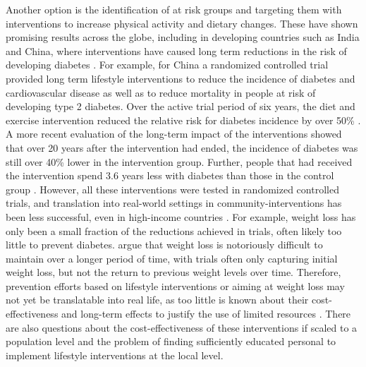 Another option is the identification of at risk groups and targeting them with interventions to increase physical activity and dietary changes. These have shown promising results across the globe, including in developing countries such as India and China, where interventions have caused long term reductions in the risk of developing diabetes \parencite{Cefalu2016}. For example, for China a randomized controlled trial provided long term lifestyle interventions to reduce the incidence of diabetes and cardiovascular disease as well as to reduce mortality in people at risk of developing type 2 diabetes. Over the active trial period of six years, the diet and exercise intervention reduced the relative risk for diabetes incidence by  over 50\% \parencite{Pan1997}. A more recent evaluation of the long-term impact of the interventions showed that over 20 years after the intervention had ended, the incidence of diabetes was still over 40\% lower in the intervention group. Further, people that had received the intervention spend 3.6 years less with diabetes than those in the control group \parencite{Li2008}. However, all these interventions were tested in randomized controlled trials, and translation into real-world settings in community-interventions has been less successful, even in high-income countries \parencite{Wareham2016, Kahn2014}. For example, weight loss has only been a small fraction of the reductions achieved in trials, often likely too little to prevent diabetes. \textcite{Kahn2014} argue that weight loss is notoriously difficult to maintain over a longer period of time, with trials often only capturing initial weight loss, but not the return to previous weight levels over time.  Therefore, prevention efforts based on lifestyle interventions or aiming at weight loss may not yet be translatable into real life, as too little is known about their cost-effectiveness and long-term effects to justify the use of limited resources \parencite{Kahn2014}. There are also questions about the cost-effectiveness of these interventions if scaled to a population level and the problem of finding sufficiently educated personal to implement lifestyle interventions at the local level. 

